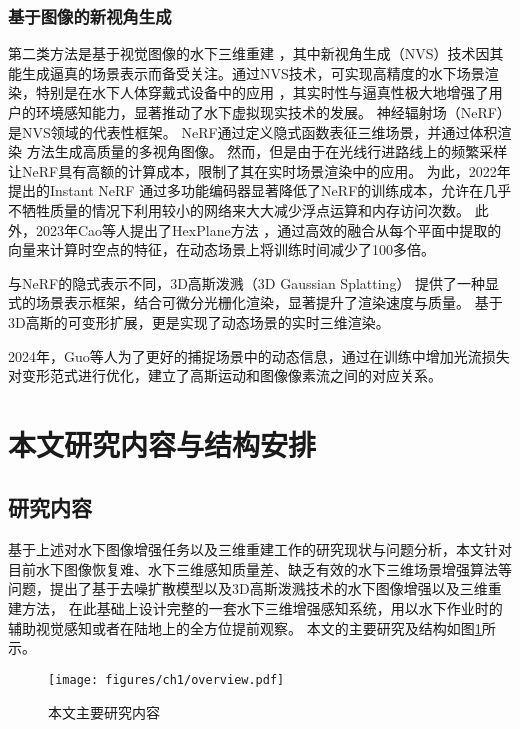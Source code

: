 \subsubsection{基于图像的新视角生成}
第二类方法是基于视觉图像的水下三维重建 \cite{vision_recon}，其中新视角生成（NVS）技术因其能生成逼真的场景表示而备受关注。通过NVS技术，可实现高精度的水下场景渲染，特别是在水下人体穿戴式设备中的应用 \cite{Xia2023}，其实时性与逼真性极大地增强了用户的环境感知能力，显著推动了水下虚拟现实技术的发展。
神经辐射场（NeRF） \cite{nerf}\cite{Mip_nerf360} 是NVS领域的代表性框架。
NeRF通过定义隐式函数表征三维场景，并通过体积渲染 \cite{volume_render} 方法生成高质量的多视角图像。
然而，但是由于在光线行进路线上的频繁采样让NeRF具有高额的计算成本，限制了其在实时场景渲染中的应用。
为此，2022年提出的Instant NeRF \cite{instant_nerf} 通过多功能编码器显著降低了NeRF的训练成本，允许在几乎不牺牲质量的情况下利用较小的网络来大大减少浮点运算和内存访问次数。
此外，2023年Cao等人提出了HexPlane方法 \cite{hex_plane}，通过高效的融合从每个平面中提取的向量来计算时空点的特征，在动态场景上将训练时间减少了100多倍。

与NeRF的隐式表示不同，3D高斯泼溅（3D Gaussian Splatting） \cite{3DGS} 提供了一种显式的场景表示框架，结合可微分光栅化渲染，显著提升了渲染速度与质量。
基于3D高斯的可变形扩展\cite{dynamic_3DGS1}\cite{dynamic_3DGS2}\cite{dynamic_3DGS_efficient}\cite{4DGS}，更是实现了动态场景的实时三维渲染。


2024年，Guo等人\cite{flow_2024motion}为了更好的捕捉场景中的动态信息，通过在训练中增加光流损失对变形范式进行优化，建立了高斯运动和图像像素流之间的对应关系。

\section{本文研究内容与结构安排}
\subsection{研究内容}
基于上述对水下图像增强任务以及三维重建工作的研究现状与问题分析，本文针对目前水下图像恢复难、水下三维感知质量差、缺乏有效的水下三维场景增强算法等问题，提出了基于去噪扩散模型以及3D高斯泼溅技术的水下图像增强以及三维重建方法，
在此基础上设计完整的一套水下三维增强感知系统，用以水下作业时的辅助视觉感知或者在陆地上的全方位提前观察。
本文的主要研究及结构如图\ref{img:overview}所示。
\begin{figure}
    \centering
    \texttt{[image: figures/ch1/overview.pdf]}
    \caption{本文主要研究内容}
    \label{img:overview}
\end{figure}

